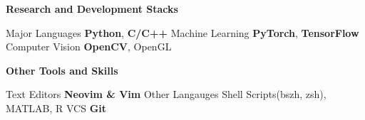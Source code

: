 
\vspace{-1em}
\begin{multicols}{2}
\textbf{Research and Development Stacks}
\vspace{-1em}
\begin{cvskills}
\cvskill
{Major Languages}
{\textbf{Python}, \textbf{C/C++}}
\cvskill
{Machine Learning}
{\textbf{PyTorch}, \textbf{TensorFlow}}
\cvskill
{Computer Vision}
{\textbf{OpenCV}, OpenGL}
\end{cvskills}

\textbf{Other Tools and Skills}
\vspace{-1em}
\begin{cvskills}
  \cvskill
    {Text Editors}
    {\textbf{Neovim \& Vim}}
  \cvskill
    {Other Langauges} %
    {Shell Scripts(bszh, zsh), MATLAB, R} %
  \cvskill
    {VCS}
    {\textbf{Git}} %
\end{cvskills}

\end{multicols}
\vspace{-0.5em}
